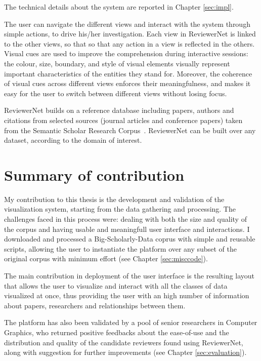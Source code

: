 The technical details about the system are reported in Chapter \ref{sec:impl}.

The user can navigate the different views and interact with the system through simple actions, to drive his/her investigation. Each view in ReviewerNet is linked to the other views, so that so that any action in a view is reflected in the others. Visual cues are used to improve the comprehension during interactive sessions: the colour, size, boundary, and style of visual elements visually represent important characteristics of the entities they stand for. Moreover, the coherence of visual cues across different views enforces their meaningfulness, and makes it easy for the user to switch between different views without losing focus.  

ReviewerNet builds on a reference database including papers, authors and citations from selected sources (journal articles and conference papers) taken from the Semantic Scholar Research Corpus~\cite{ammar:18}. ReviewerNet can be built over any dataset, according to the domain of interest.

\section{Summary of contribution}

My contribution to this thesis is the development and validation of the visualization system, starting from the data gathering and processing. The challenges faced in this process were: dealing with both the size and quality of the corpus and having usable and meaningfull user interface and interactions. I downloaded and processed a Big-Scholarly-Data coprus with simple and reusable scripts, allowing the user to instantiate the platform over any subset of the original corpus with minimum effort (see Chapter \ref{sec:misccode}). 

The main contribution in deployment of the user interface is the resulting layout that allows the user to visualize and interact with all the classes of data visualized at once, thus providing the user with an high number of information about papers, researchers and relationships between them.

The platform has also been validated by a pool of senior researchers in Computer Graphics, who returned positive feedbacks about the ease-of-use and the distribution and quality of the candidate reviewers found using ReviewerNet, along with suggestion for further improvements (see Chapter \ref{sec:evaluation}). 

